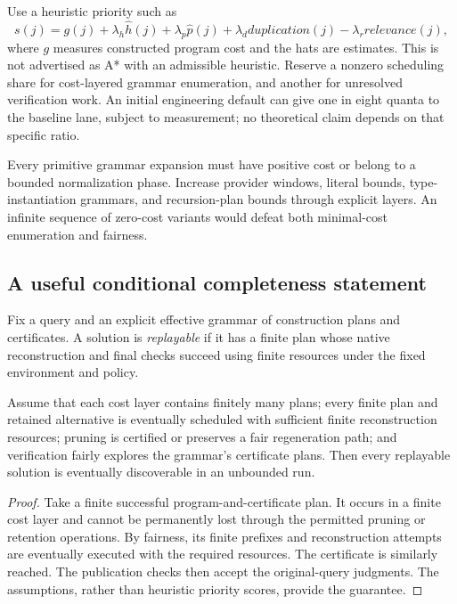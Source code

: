 Use a heuristic priority such as
\[
 s(j)=g(j)+\lambda_h\widehat h(j)+\lambda_p\widehat p(j)
       +\lambda_d\mathit{duplication}(j)-\lambda_r\mathit{relevance}(j),
\]
where $g$ measures constructed program cost and the hats are estimates. This is not advertised as A* with an admissible heuristic. Reserve a nonzero scheduling share for cost-layered grammar enumeration, and another for unresolved verification work. An initial engineering default can give one in eight quanta to the baseline lane, subject to measurement; no theoretical claim depends on that specific ratio.

Every primitive grammar expansion must have positive cost or belong to a bounded normalization phase. Increase provider windows, literal bounds, type-instantiation grammars, and recursion-plan bounds through explicit layers. An infinite sequence of zero-cost variants would defeat both minimal-cost enumeration and fairness.

\subsection{A useful conditional completeness statement}
\begin{definition}
Fix a query and an explicit effective grammar of construction plans and certificates. A solution is \emph{replayable} if it has a finite plan whose native reconstruction and final checks succeed using finite resources under the fixed environment and policy.
\end{definition}
\begin{proposition}
Assume that each cost layer contains finitely many plans; every finite plan and retained alternative is eventually scheduled with sufficient finite reconstruction resources; pruning is certified or preserves a fair regeneration path; and verification fairly explores the grammar's certificate plans. Then every replayable solution is eventually discoverable in an unbounded run.
\end{proposition}
\begin{proof}
Take a finite successful program-and-certificate plan. It occurs in a finite cost layer and cannot be permanently lost through the permitted pruning or retention operations. By fairness, its finite prefixes and reconstruction attempts are eventually executed with the required resources. The certificate is similarly reached. The publication checks then accept the original-query judgments. The assumptions, rather than heuristic priority scores, provide the guarantee.
\end{proof}

